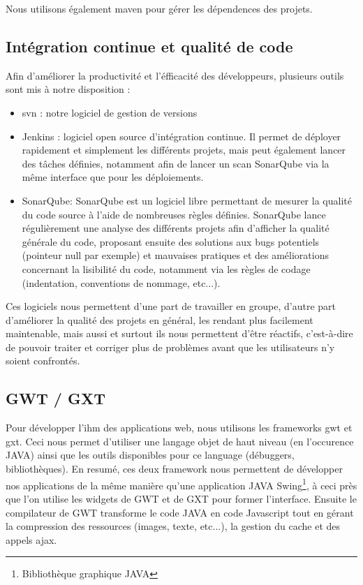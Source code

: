 \documentclass[12pt]{report}
\begin{document}
    Nous utilisons également \gls{maven} pour gérer les dépendences des projets.\vspace{-0.5em}
    
    \subsection{Intégration continue et qualité de code}
    
    Afin d'améliorer la productivité et l'éfficacité des développeurs, plusieurs outils sont mis à notre disposition :
    \begin{itemize}[itemsep=0em]
        \item \gls{svn} : notre logiciel de gestion de versions
        \item Jenkins : logiciel open source d'intégration continue. Il permet de déployer rapidement et simplement les différents projets, mais peut également lancer des tâches définies, notamment afin de lancer un scan SonarQube via la même interface que pour les déploiements.
        \item SonarQube: SonarQube est un logiciel libre permettant de mesurer la qualité du code source à l'aide de nombreuses règles définies. SonarQube lance régulièrement une analyse des différents projets afin d'afficher la qualité générale du code, proposant ensuite des solutions aux bugs potentiels (pointeur null par exemple) et mauvaises pratiques et des améliorations concernant la lisibilité du code, notamment via les règles de codage (indentation, conventions de nommage, etc...).
    \end{itemize}
    
    Ces logiciels nous permettent d'une part de travailler en groupe, d'autre part d'améliorer la qualité des projets en général, les rendant plus facilement maintenable, mais aussi et surtout ils nous permettent d'être réactifs, c'est-à-dire de pouvoir traiter et corriger plus de problèmes avant que les utilisateurs n'y soient confrontés.
    
    \subsection{GWT / GXT}
    Pour développer l'\acrfull{ihm} des applications web, nous utilisons les frameworks \gls{gwt} et \gls{gxt}. Ceci nous permet d'utiliser une langage objet de haut niveau (en l'occurence JAVA) ainsi que les outils disponibles pour ce language (débuggers, bibliothèques). En resumé, ces deux framework nous permettent de développer nos applications de la même manière qu'une application JAVA Swing\footnote{Bibliothèque graphique JAVA}, à ceci près que l'on utilise les widgets de GWT et de GXT pour former l'interface. Ensuite le compilateur de GWT transforme le code JAVA en code Javascript tout en gérant la compression des ressources (images, texte, etc...), la gestion du cache et des appels \gls{ajax}.
    
\end{document}
